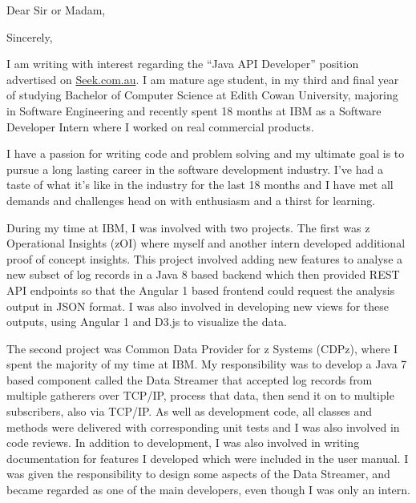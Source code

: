 \documentclass[10pt,a4paper,sans]{moderncv}        %
\begin{document}
\date{\today}
\opening{Dear Sir or Madam,}
\closing{Sincerely,}
\makelettertitle

I am writing with interest regarding the ``Java API Developer'' position advertised on \href{https://www.seek.com.au/job/33237951?type=standout&tier=no_tier&pos=1&whereid=3000&userqueryid=9ed0336a00786a41bf4398256cfb67a3-2819278&ref=beta}{Seek.com.au}. I am mature age student, in my third and final year of studying Bachelor of Computer Science at Edith Cowan University, majoring in Software Engineering and recently spent 18 months at IBM as a Software Developer Intern where I worked on real commercial products.

I have a passion for writing code and problem solving and my ultimate goal is to pursue a long lasting career in the software development industry. I've had a taste of what it's like in the industry for the last 18 months and I have met all demands and challenges head on with enthusiasm and a thirst for learning.

During my time at IBM, I was involved with two projects. The first was z Operational Insights (zOI) where myself and another intern developed additional proof of concept insights. This project involved adding new features to analyse a new subset of log records in a Java 8 based backend which then provided REST API endpoints so that the Angular 1 based frontend could request the analysis output in JSON format. I was also involved in developing new views for these outputs, using Angular 1 and D3.js to visualize the data.

The second project was Common Data Provider for z Systems (CDPz), where I spent the majority of my time at IBM. My responsibility was to develop a Java 7 based component called the Data Streamer that accepted log records from multiple gatherers over TCP/IP, process that data, then send it on to multiple subscribers, also via TCP/IP. As well as development code, all classes and methods were delivered with corresponding unit tests and I was also involved in code reviews. In addition to development, I was also involved in writing documentation for features I developed which were included in the user manual. I was given the responsibility to design some aspects of the Data Streamer, and became regarded as one of the main developers, even though I was only an intern.
\end{document}
